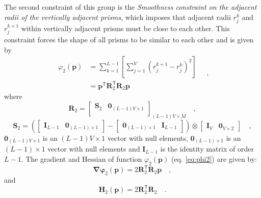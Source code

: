 The second constraint of this group is the \textit{Smoothness constraint on the adjacent radii of the 
vertically adjacent prisms}, which imposes that adjacent radii $r_{j}^{k}$ and $r_{j}^{k+1}$ within vertically 
adjacent prisms must be close to each other. This constraint forces the shape of all prisms to be similar to each other
and is given by
\begin{equation}\label{eq:phi2}
\begin{split}
\varphi_{2}(\mathbf{p}) &= \sum\limits^{L-1}_{k=1}\left[\sum\limits^{V}_{j=1}\left(r^{k+1}_{j}-r^{k}_{j}\right)^2\right] \\
&= \mathbf{p}^{\mathsf{T}} \mathbf{R}^{\mathsf{T}}_{2}\mathbf{R}_{2}\mathbf{p}
\end{split} \quad ,
\end{equation}
where 
\begin{equation}
\mathbf{R}_{2} = 
\begin{bmatrix}
\mathbf{S}_{2} & \mathbf{0}_{(L-1)V \times 1} \\
\end{bmatrix}_{(L-1)V \times M} \quad ,
\label{eq:R2-matrix}
\end{equation}
\begin{equation}
\mathbf{S}_{2} =
\left( 
\begin{bmatrix} \mathbf{I}_{L-1} & \mathbf{0}_{(L-1) \times 1} \end{bmatrix} -
\begin{bmatrix} \mathbf{0}_{(L-1) \times 1} & \mathbf{I}_{L-1} \end{bmatrix} 
\right) \otimes 
\begin{bmatrix} \mathbf{I}_{V} & \mathbf{0}_{V \times 2} \end{bmatrix} \quad ,
\label{eq:S2-matrix}
\end{equation}
$\mathbf{0}_{(L-1)V \times 1}$ is an $(L-1)V \times 1$ vector with null elements,
$\mathbf{0}_{(L-1) \times 1}$ is an $(L-1) \times 1$ vector with null elements and 
$\mathbf{I}_{L-1}$ is the identity matrix of order $L-1$. The gradient and Hessian of function $\varphi_{2}(\mathbf{p})$ (eq. \ref{eq:phi2}) are given by:
\begin{equation}\label{eq:phi2_grad}
\boldsymbol{\nabla\varphi}_{2}(\mathbf{p}) = 2\mathbf{R}^\mathsf{T}_{2}\mathbf{R}_{2}\mathbf{p} \quad ,
\end{equation}
and
\begin{equation}\label{eq:phi2_hessian}
\mathbf{H}_{2}(\mathbf{p}) = 2\mathbf{R}^\mathsf{T}_{2}\mathbf{R}_{2} \quad .
\end{equation}

